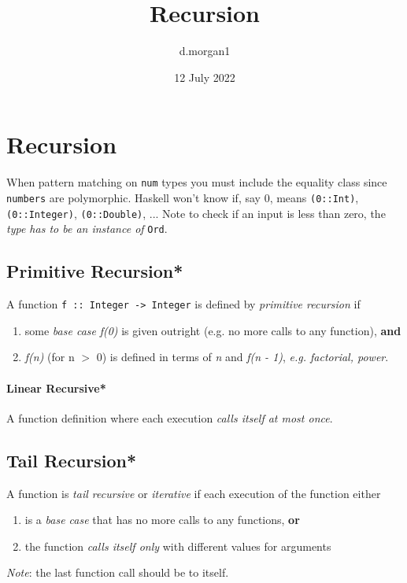 \documentclass{article}
\title{Recursion}
\author{d.morgan1}
\date{12 July 2022}
\begin{document}
\maketitle

\section{Recursion}
When pattern matching on \textcolor{Emerald}{\texttt{num}} types you must include the equality class since \textcolor{Emerald}{\texttt{numbers}} are polymorphic. Haskell won't know if, say 0, means \textcolor{Emerald}{\texttt{(0::Int)}}, \textcolor{Emerald}{\texttt{(0::Integer)}},
\textcolor{Emerald}{\texttt{(0::Double)}}, ...
\newline Note to check if an input is less than zero, the \textcolor{Rhodamine}{\emph{type has to be an instance of}} \textcolor{Emerald}{\texttt{Ord}}.

\subsection*{Primitive Recursion*}
A function \textcolor{Emerald}{\texttt{f :: Integer -> Integer}} is defined by \textcolor{Rhodamine}{\emph{primitive recursion}} if
\begin{enumerate}
    \item some \textcolor{Rhodamine}{\emph{base case}} \emph{f(0)} is given outright (e.g. no more calls to any function), \textbf{\textcolor{Rhodamine}{and}}
    \item \emph{f(n)} (for n $>$ 0) is defined in terms of \emph{n} and \emph{f(n - 1)}, \textcolor{Rhodamine}{\emph{e.g. factorial, power}}.
\end{enumerate}

\paragraph{Linear Recursive*}
A function definition where each execution \textcolor{Rhodamine}{\emph{calls itself at most once}}.

\subsection*{Tail Recursion*}
A function is \textcolor{Rhodamine}{\emph{tail recursive}} or \textcolor{Rhodamine}{\emph{iterative}} if each execution of the function either
\begin{enumerate}
    \item is a \textcolor{Rhodamine}{\emph{base case}} that has no more calls to any functions, \textbf{\textcolor{Rhodamine}{or}}
    \item the function \textcolor{Rhodamine}{\emph{calls itself only}} with different values for arguments
\end{enumerate}
\textcolor{Rhodamine}{\emph{Note}}: the last function call should be to itself.
\end{document}
